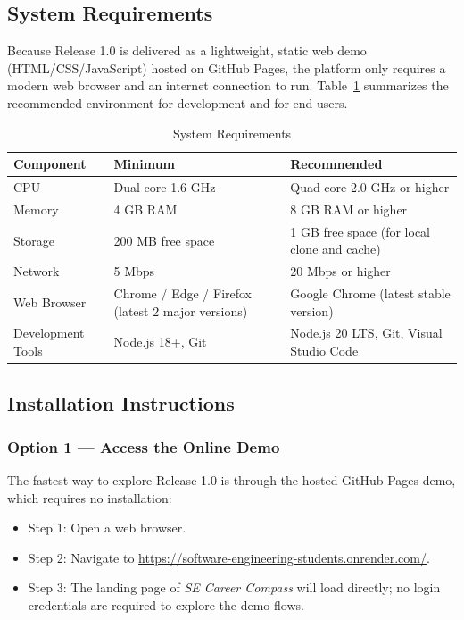 \subsection{System Requirements}

Because Release 1.0 is delivered as a lightweight, static web demo (HTML/CSS/JavaScript) hosted on GitHub Pages, the platform only requires a modern web browser and an internet connection to run. Table~\ref{tab:sysreq} summarizes the recommended environment for development and for end users.

\begin{table}[H]
\centering
\caption{System Requirements}
\label{tab:sysreq}
\renewcommand{\arraystretch}{1.4}
\begin{tabularx}{\textwidth}{|l|X|X|}
\hline
\rowcolor{tableheader}
\textbf{Component} & \textbf{Minimum} & \textbf{Recommended} \\
\hline
CPU & Dual-core 1.6 GHz & Quad-core 2.0 GHz or higher \\
\hline
Memory & 4 GB RAM & 8 GB RAM or higher \\
\hline
Storage & 200 MB free space & 1 GB free space (for local clone and cache) \\
\hline
Network & 5 Mbps & 20 Mbps or higher \\
\hline
Web Browser & Chrome / Edge / Firefox (latest 2 major versions) & Google Chrome (latest stable version) \\
\hline
Development Tools & Node.js 18+, Git & Node.js 20 LTS, Git, Visual Studio Code \\
\hline
\end{tabularx}
\end{table}

\subsection{Installation Instructions}

\subsubsection{Option 1 — Access the Online Demo}

The fastest way to explore Release 1.0 is through the hosted GitHub Pages demo, which requires no installation:

\begin{itemize}[nosep]
    \item Step 1: Open a web browser.
    \item Step 2: Navigate to \url{https://software-engineering-students.onrender.com/}.
    \item Step 3: The landing page of \textit{SE Career Compass} will load directly; no login credentials are required to explore the demo flows.
\end{itemize}

